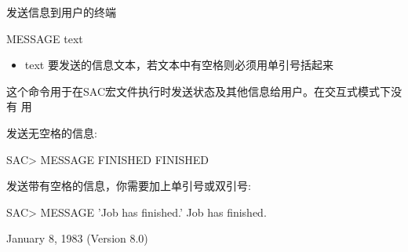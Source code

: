 \label{cmd:message}

发送信息到用户的终端

MESSAGE text

\begin{itemize}
\item text 要发送的信息文本，若文本中有空格则必须用单引号括起来
\end{itemize}

这个命令用于在SAC宏文件执行时发送状态及其他信息给用户。在交互式模式下没有	用

发送无空格的信息:
\begin{SACCode}
SAC> MESSAGE FINISHED
 FINISHED
\end{SACCode}

发送带有空格的信息，你需要加上单引号或双引号:
\begin{SACCode}
SAC> MESSAGE 'Job has finished.'
 Job has finished.
\end{SACCode}

January 8, 1983 (Version 8.0)
